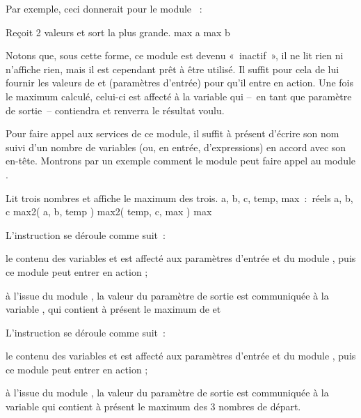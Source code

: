 	Par exemple, ceci donnerait pour le module ~:

	\begin{Pseudocode}
		\RComment Reçoit 2 valeurs et sort la plus grande.
			\Let max \Gets a
		\Else
			\Let max \Gets b
		\EndIf
	\EndModule
	\end{Pseudocode}

	Notons que, sous cette forme, ce module est devenu «~inactif~», il ne
	lit rien ni n’affiche rien, mais il est cependant prêt à être utilisé. Il
	suffit pour cela de lui fournir les valeurs de  et
	 (paramètres d’entrée) pour qu’il entre en action.
	Une fois le maximum calculé, celui-ci est affecté à la variable
	 qui –~en tant que paramètre de sortie~–
	contiendra et renverra le résultat voulu.

	Pour faire appel aux services de ce module, 
	il suffit à présent d’écrire son nom suivi d’un nombre de variables 
	(ou, en entrée, d’expressions) en accord avec son en-tête. 
	Montrons par un exemple comment le module \pseudocode{max3}
	peut faire appel au module \pseudocode{max2}.

	\begin{Pseudocode}
	\Module{max3}{}{}
		\RComment Lit trois nombres et affiche le maximum des trois.
		\Decl a, b, c, temp, max~:~réels
		\Read a, b, c
		\Stmt max2( a, b, temp )
		\Stmt max2( temp, c, max )
		\Write max
	\EndModule
	\end{Pseudocode}

	L’instruction  se déroule comme suit~:
	
	\begin{liste}
	\item
		le contenu des variables  et \pseudocode{b}
		est affecté aux paramètres d’entrée
		 et \pseudocode{b}
		du module ,
		puis ce module peut entrer en action ;
	\item
		à l’issue du module \pseudocode{max2},
		la valeur du paramètre de sortie
		 est communiquée à la variable
		\pseudocode{temp},
		qui contient à présent le maximum de
		 et 
	\end{liste}

	L’instruction  se déroule comme suit~:
	
	\begin{liste}
	\item
		le contenu des variables  et \pseudocode{c}
		est affecté aux paramètres d’entrée
		 et 
		du module ,
		puis ce module peut entrer en action ;
	\item
		à l’issue du module ,
		la valeur du paramètre de sortie
		 est communiquée à la variable
		\pseudocode{max}
		qui contient à présent le maximum des 3 nombres de départ.
	\end{liste}

